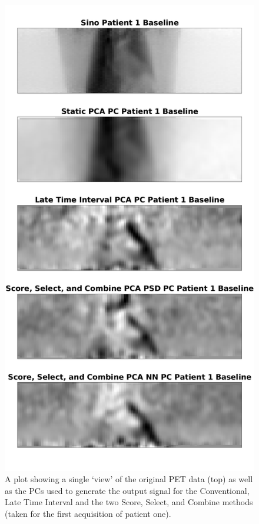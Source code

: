     \begin{figure}
        \centering
        
        \includegraphics[width=0.7\linewidth]{patient_one_pc_output.png}
        
        \captionsetup{singlelinecheck=false}
        \caption{A plot showing a single `view' of the original PET data (top) as well as the \glspl{PC} used to generate the output signal for the Conventional, Late Time Interval and the two Score, Select, and Combine methods (taken for the first acquisition of patient one).}
        \label{fig:patient_one_pc_output}
    \end{figure}

